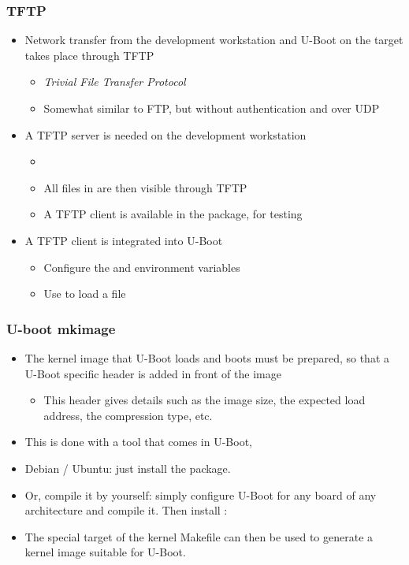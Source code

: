\begin{frame}
  \frametitle{TFTP}
  \begin{itemize}
  \item Network transfer from the development workstation and U-Boot
    on the target takes place through TFTP
    \begin{itemize}
    \item {\em Trivial File Transfer Protocol}
    \item Somewhat similar to FTP, but without authentication and over
      UDP
    \end{itemize}
  \item A TFTP server is needed on the development workstation
    \begin{itemize}
    \item {}
    \item All files in  are then visible
      through TFTP
    \item A TFTP client is available in the  package,
      for testing
    \end{itemize}
  \item A TFTP client is integrated into U-Boot
    \begin{itemize}
    \item Configure the  and  environment
      variables
    \item Use  to load a file
    \end{itemize}
  \end{itemize}
\end{frame}

\begin{frame}
  \frametitle{U-boot mkimage}
  \begin{itemize}
  \item The kernel image that U-Boot loads and boots must be prepared,
    so that a U-Boot specific header is added in front of the image
    \begin{itemize}
    \item This header gives details such as the image size, the
      expected load address, the compression type, etc.
    \end{itemize}
  \item This is done with a tool that comes in U-Boot, 
  \item Debian / Ubuntu: just install the  package.
  \item Or, compile it by yourself: simply configure U-Boot for any
    board of any architecture and compile it. Then install :\\
  \item The special target  of the kernel Makefile can
    then be used to generate a kernel image suitable for U-Boot.
\end{itemize}
\end{frame}
